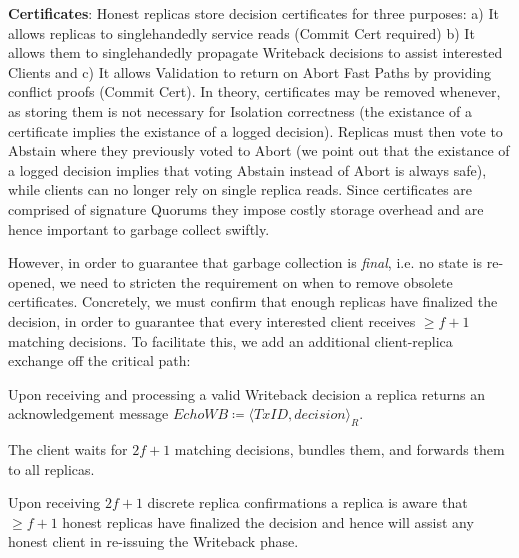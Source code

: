 \textbf{Certificates}: Honest replicas store decision certificates for three purposes: a) It allows replicas to singlehandedly service reads (Commit Cert required) b) It allows them to singlehandedly propagate Writeback decisions to assist interested Clients and c) It allows Validation to return on Abort Fast Paths by providing conflict proofs (Commit Cert).
In theory, certificates may be removed whenever, as storing them is not necessary for Isolation correctness (the existance of a certificate implies the existance of a logged decision). Replicas  must then vote to Abstain where they previously voted to Abort (we point out that the existance of a logged decision implies that voting Abstain instead of Abort is always safe), while clients can no longer rely on single replica reads. Since certificates are comprised of signature Quorums they impose costly storage overhead and are hence important to garbage collect swiftly.

However, in order to guarantee that garbage collection is \textit{final}, i.e. no state is re-opened, we need to stricten the requirement on when to remove obsolete certificates. Concretely, we must confirm that enough replicas have finalized the decision, in order to guarantee that every interested client receives $\geq f+1$ matching decisions.  To facilitate this, we add an additional client-replica exchange off the critical path:

Upon receiving and processing a valid Writeback decision a replica returns an acknowledgement message $EchoWB \coloneqq \langle TxID, decision \rangle_R$.

The client waits for $2f+1$ matching decisions, bundles them, and forwards them to all replicas.

Upon receiving $2f+1$ discrete replica confirmations a replica is aware that $\geq f+1$ honest replicas have finalized the decision and hence will assist any honest client in re-issuing the Writeback phase.

